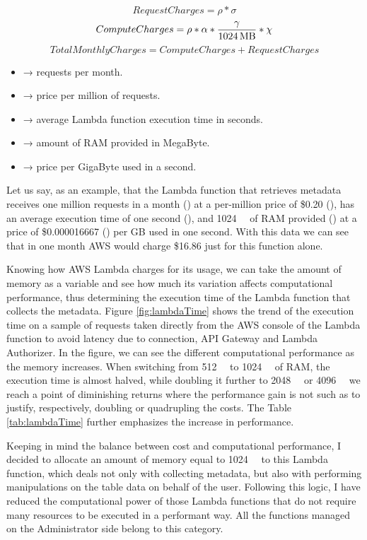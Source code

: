 \[Request Charges =  \rho * \sigma\]
\[Compute Charges =  \rho * \alpha *\frac{\gamma}{\SI{1024}{\mega\byte}}*\chi \]
\[Total Monthly Charges =  Compute Charges + Request Charges\]

\begin{itemize}
    \item \textbf{\textrho} → requests per month.
    \item \textbf{\textsigma} → price per million of requests.
    \item \textbf{\textalpha} → average Lambda function execution time in seconds.
    \item \textbf{\textgamma} → amount of RAM provided in MegaByte.
    \item \textbf{\textchi} → price per GigaByte used in a second.
\end{itemize}

Let us say, as an example, that the Lambda function that retrieves metadata receives one million requests in a month (\textrho) at a per-million price of \$0.20 (\textsigma), has an average execution time of one second (\textalpha), and \SI{1024}{\mega\byte} of RAM provided (\textgamma) at a price of \$0.000016667 (\textchi) per GB used in one second. With this data we can see that in one month AWS would charge \$16.86 just for this function alone.

Knowing how AWS Lambda charges for its usage, we can take the amount of memory as a variable and see how much its variation affects computational performance, thus determining the execution time of the Lambda function that collects the metadata. Figure \ref{fig:lambdaTime} shows the trend of the execution time on a sample of requests taken directly from the AWS console of the Lambda function to avoid latency due to connection, API Gateway and Lambda Authorizer. In the figure, we can see the different computational performance as the memory increases. When switching from \SI{512}{\mega\byte} to \SI{1024}{\mega\byte} of RAM, the execution time is almost halved, while doubling it further to \SI{2048}{\mega\byte} or \SI{4096}{\mega\byte} we reach a point of diminishing returns where the performance gain is not such as to justify, respectively, doubling or quadrupling the costs. The Table \ref{tab:lambdaTime} further emphasizes the increase in performance.  

Keeping in mind the balance between cost and computational performance, I decided to allocate an amount of memory equal to \SI{1024}{\mega\byte} to this Lambda function, which deals not only with collecting metadata, but also with performing manipulations on the table data on behalf of the user. Following this logic, I have reduced the computational power of those Lambda functions that do not require many resources to be executed in a performant way. All the functions managed on the Administrator side belong to this category.


